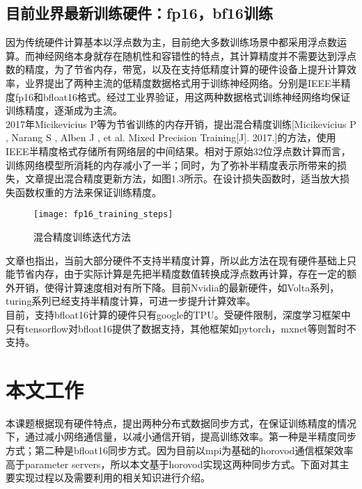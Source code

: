 \subsection{目前业界最新训练硬件：fp16，bf16训练}
因为传统硬件计算基本以浮点数为主，目前绝大多数训练场景中都采用浮点数运算。而神经网络本身就存在随机性和容错性的特点，其计算精度并不需要达到浮点数的精度，为了节省内存，带宽，以及在支持低精度计算的硬件设备上提升计算效率，业界提出了两种主流的低精度数据格式用于训练神经网络。分别是IEEE半精度fp16和bfloat16格式。经过工业界验证，用这两种数据格式训练神经网络均保证训练精度，逐渐成为主流。\\
2017年Micikevicius P等为节省训练的内存开销，提出混合精度训练[Micikevicius P , Narang S , Alben J , et al. Mixed Precision Training[J]. 2017.]的方法，使用IEEE半精度格式存储所有网络层的中间结果。相对于原始32位浮点数计算而言，训练网络模型所消耗的内存减小了一半；同时，为了弥补半精度表示所带来的损失，文章提出混合精度更新方法，如图1.3所示。在设计损失函数时，适当放大损失函数权重的方法来保证训练精度。\\
\begin{figure}[htp]
\centering
\texttt{[image: fp16\_training\_steps]}
\caption{混合精度训练迭代方法}
\end{figure}
文章也指出，当前大部分硬件不支持半精度计算，所以此方法在现有硬件基础上只能节省内存，由于实际计算是先把半精度数值转换成浮点数再计算，存在一定的额外开销，使得计算速度相对有所下降。目前Nvidia的最新硬件，如Volta系列，turing系列已经支持半精度计算，可进一步提升计算效率。\\
目前，支持bfloat16计算的硬件只有google的TPU。受硬件限制，深度学习框架中只有tensorflow对bfloat16提供了数据支持，其他框架如pytorch，mxnet等则暂时不支持。

\section{本文工作}
本课题根据现有硬件特点，提出两种分布式数据同步方式，在保证训练精度的情况下，通过减小网络通信量，以减小通信开销，提高训练效率。第一种是半精度同步方式；第二种是bfloat16同步方式。因为目前以mpi为基础的horovod通信框架效率高于parameter servers，所以本文基于horovod实现这两种同步方式。下面对其主要实现过程以及需要利用的相关知识进行介绍。
